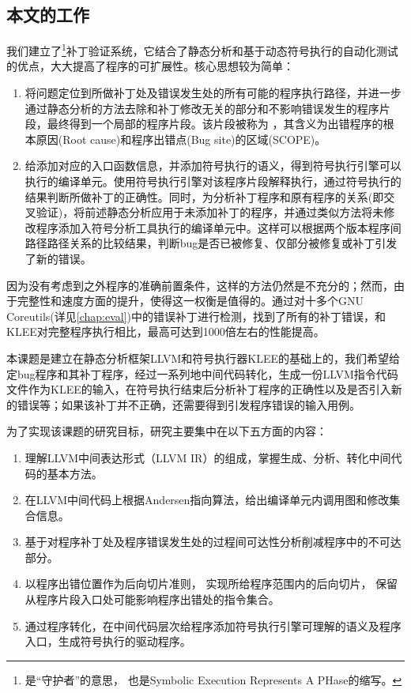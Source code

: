 \subsection{本文的工作}
\label{sec:contr}

我们建立了\dryrun\footnote{\dryrun 是“守护者”的意思， 也是Symbolic Execution Represents A PHase的缩写。}补丁验证系统，它结合了静态分析和基于动态符号执行的自动化测试的优点，大大提高了程序的可扩展性。\dryrun 核心思想较为简单：
\begin{enumerate}
\item 将问题定位到所做补丁处及错误发生处的所有可能的程序执行路径，并进一步通过静态分析的方法去除和补丁修改无关的部分和不影响错误发生的程序片段，最终得到一个局部的程序片段。该片段被称为 \rbscope ，其含义为出错程序的根本原因(Root cause)和程序出错点(Bug site)的区域(SCOPE)。
\item 给\rbscope 添加对应的入口函数信息，并添加符号执行的语义，得到符号执行引擎可以执行的编译单元。使用符号执行引擎对该程序片段解释执行，通过符号执行的结果判断所做补丁的正确性。同时，为分析补丁程序和原有程序的关系(即交叉验证)，将前述静态分析应用于未添加补丁的程序，并通过类似方法将未修改程序添加入符号分析工具执行的编译单元中。这样可以根据两个版本程序间路径\cndash 路径关系的比较结果，判断bug是否已被修复、仅部分被修复或补丁引发了新的错误。
\end{enumerate}

因为没有考虑到\rbscope 之外程序的准确前置条件，这样的方法仍然是不充分的；然而，由于完整性和速度方面的提升，使得这一权衡是值得的。\dryrun 通过对十多个GNU Coreutils(详见\autoref{chap:eval})中的错误补丁进行检测，找到了所有的补丁错误，和KLEE对完整程序执行相比，最高可达到1000倍左右的性能提高。


本课题是建立在静态分析框架LLVM和符号执行器KLEE的基础上的，我们希望给定bug程序和其补丁程序，经过一系列地中间代码转化，生成一份LLVM指令代码文件作为KLEE的输入，在符号执行结束后分析补丁程序的正确性以及是否引入新的错误等；如果该补丁并不正确，还需要得到引发程序错误的输入用例。

为了实现该课题的研究目标，研究主要集中在以下五方面的内容：
\begin{enumerate}[label={(\arabic*)}]
\item 理解LLVM中间表达形式（LLVM IR）的组成，掌握生成、分析、转化中间代码的基本方法。
\item 在LLVM中间代码上根据Andersen指向算法，给出编译单元内调用图和修改集合信息。
\item 基于对程序补丁处及程序错误发生处的过程间可达性分析削减程序中的不可达部分。
\item 以程序出错位置作为后向切片准则， 实现所给程序范围内的后向切片， 保留从程序片段入口处可能影响程序出错处的指令集合。
\item 通过程序转化，在中间代码层次给程序添加符号执行引擎可理解的语义及程序入口，生成符号执行的驱动程序。
\end{enumerate}

